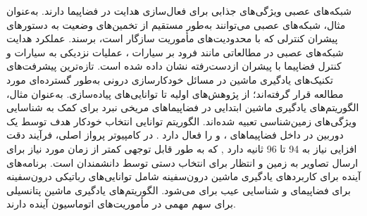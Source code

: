 \documentclass[a4paper]{article}
\begin{document}
{%




شبکه‌های عصبی ویژگی‌های جذابی برای فعال‌سازی هدایت در فضاپیما دارند. به‌عنوان مثال، شبکه‌های عصبی می‌توانند به‌طور مستقیم از تخمین‌های وضعیت به دستورهای پیشران کنترلی که با محدودیت‌های مأموریت سازگار است، برسند. عملکرد هدایت شبکه‌های عصبی در مطالعاتی مانند فرود بر سیارات \cite{gaudet2020six}، عملیات نزدیکی به سیارات \cite{gaudet2020terminal} و کنترل فضاپیما با پیشران ازدست‌رفته \cite{rubinsztejn2020neural} نشان داده شده است.
تازه‌ترین پیشرفت‌های تکنیک‌های یادگیری ماشین در مسائل خودکارسازی درونی به‌طور گسترده‌ای مورد مطالعه قرار گرفته‌اند؛ از پژوهش‌های اولیه تا توانایی‌های پیاده‌سازی.
به‌عنوان مثال، الگوریتم‌های یادگیری ماشین ابتدایی در فضاپیماهای مریخی نبرد برای کمک به شناسایی ویژگی‌های زمین‌شناسی تعبیه شده‌اند. الگوریتم  توانایی انتخاب خودکار هدف توسط یک دوربین در داخل فضاپیماهای ،  و  را فعال دارد
\cite{estlin2012aegis}.
  در کامپیوتر پرواز اصلی، فرآیند دقت افزایی  نیاز به 94 تا 96 ثانیه دارد 
  \cite{francis2017aegis},
   که به طور قابل توجهی کمتر از زمان مورد نیاز برای ارسال تصاویر به زمین و انتظار برای انتخاب دستی توسط دانشمندان است.
   برنامه‌های آینده برای کاربردهای یادگیری ماشین درون‌سفینه شامل توانایی‌های رباتیکی درون‌سفینه برای فضاپیمای 
\cite{higa2019vision, rothrock2016spoc}
     و شناسایی عیب برای 
\cite{wagstaff2019enabling} می‌شود. الگوریتم‌های یادگیری ماشین پتانسیلی برای سهم مهمی در مأموریت‌های اتوماسیون آینده دارند.


}
\end{document}
